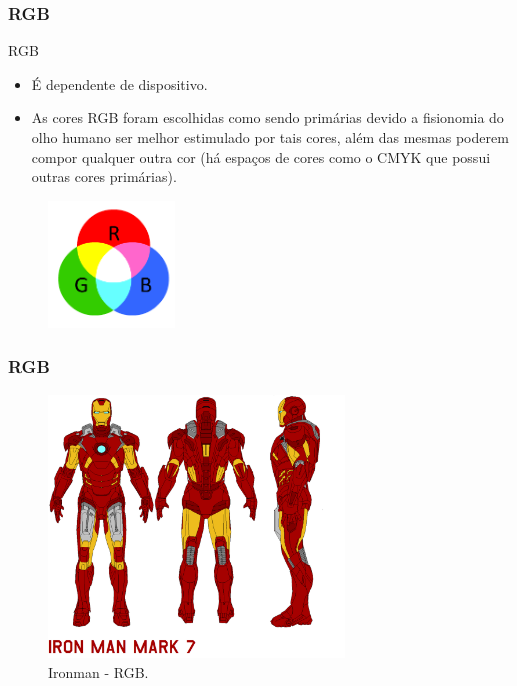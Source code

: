 \documentclass{beamer}
\begin{document}
\begin{frame}
\frametitle{RGB}

		\begin{block}{RGB}
			\begin{itemize}
				\item É dependente de dispositivo.
				\item As cores RGB foram escolhidas como sendo primárias devido a fisionomia do olho humano ser melhor estimulado por tais cores, além das mesmas poderem compor qualquer outra cor (há espaços de cores como o CMYK que possui outras cores primárias).
			\end{itemize} 
		\end{block}
		
		\begin{figure}[!h]
			\begin{center}
				\includegraphics[width=0.3\textwidth]{Figures/PRGB}
			\end{center}
		\end{figure}
	
\end{frame}

\begin{frame}
\frametitle{RGB}
		
		\begin{figure}[!h]
			\begin{center}
				\includegraphics[width=0.7\textwidth]{Figures/Iro}
				\caption{Ironman - RGB.}
			\end{center}
		\end{figure}
	
\end{frame}
\end{document}
